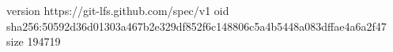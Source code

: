 version https://git-lfs.github.com/spec/v1
oid sha256:50592d36d01303a467b2e329df852f6c148806c5a4b5448a083dffae4a6a2f47
size 194719
